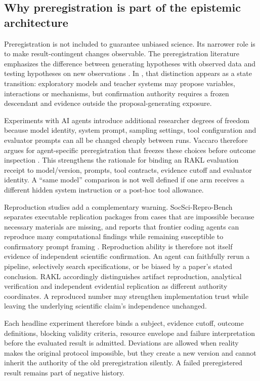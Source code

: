 \subsection{Why preregistration is part of the epistemic architecture}

Preregistration is not included to guarantee unbiased science. Its narrower role is to make result-contingent changes observable. The preregistration literature emphasizes the difference between generating hypotheses with observed data and testing hypotheses on new observations \cite{nosek2018}. In \RAKL{}, that distinction appears as a state transition: exploratory models and teacher systems may propose variables, interactions or mechanisms, but confirmation authority requires a frozen descendant and evidence outside the proposal-generating exposure.

Experiments with AI agents introduce additional researcher degrees of freedom because model identity, system prompt, sampling settings, tool configuration and evaluator prompts can all be changed cheaply between runs. Vaccaro therefore argues for agent-specific preregistration that freezes these choices before outcome inspection \cite{vaccaro2026preregagents}. This strengthens the rationale for binding an RAKL evaluation receipt to model/version, prompts, tool contracts, evidence cutoff and evaluator identity. A ``same model'' comparison is not well defined if one arm receives a different hidden system instruction or a post-hoc tool allowance.

Reproduction studies add a complementary warning. SocSci-Repro-Bench separates executable replication packages from cases that are impossible because necessary materials are missing, and reports that frontier coding agents can reproduce many computational findings while remaining susceptible to confirmatory prompt framing \cite{alizadeh2026socsci}. Reproduction ability is therefore not itself evidence of independent scientific confirmation. An agent can faithfully rerun a pipeline, selectively search specifications, or be biased by a paper's stated conclusion. RAKL accordingly distinguishes artifact reproduction, analytical verification and independent evidential replication as different authority coordinates. A reproduced number may strengthen implementation trust while leaving the underlying scientific claim's independence unchanged.

Each headline experiment therefore binds a subject, evidence cutoff, outcome definitions, blocking validity criteria, resource envelope and failure interpretation before the evaluated result is admitted. Deviations are allowed when reality makes the original protocol impossible, but they create a new version and cannot inherit the authority of the old preregistration silently. A failed preregistered result remains part of negative history.

